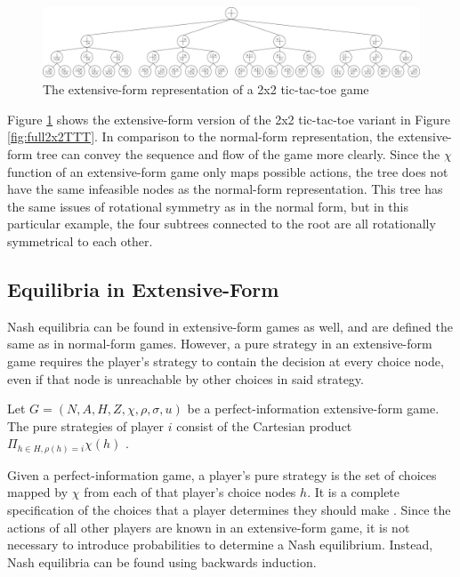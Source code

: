 \begin{figure}[H]
  \centering
  \includegraphics[width=16cm]{figures/TTTExtTree.png}
  \caption{The extensive-form representation of a 2x2 tic-tac-toe game}
  \label{fig:2x2TTTExtForm}
\end{figure}

Figure \ref{fig:2x2TTTExtForm} shows the extensive-form version of the 2x2 tic-tac-toe variant in Figure \ref{fig:full2x2TTT}. In comparison to the normal-form representation, the extensive-form tree can convey the sequence and flow of the game more clearly. Since the $\chi$ function of an extensive-form game only maps possible actions, the tree does not have the same infeasible nodes as the normal-form representation. This tree has the same issues of rotational symmetry as in the normal form, but in this particular example, the four subtrees connected to the root are all rotationally symmetrical to each other.
\newpage
\subsection{Equilibria in Extensive-Form}
Nash equilibria can be found in extensive-form games as well, and are defined the same as in normal-form games. However, a pure strategy in an extensive-form game requires the player's strategy to contain the decision at every choice node, even if that node is unreachable by other choices in said strategy.\\
\begin{define}
  Let $G = (N, A, H, Z, \chi, \rho, \sigma, u)$ be a perfect-information extensive-form game. The pure strategies of player $i$ consist of the Cartesian product $\Pi_{h\in H, \rho(h)=i}\chi(h)$ \cite{shoh09}.
\end{define}
Given a perfect-information game, a player's pure strategy is the set of choices mapped by $\chi$ from each of that player's choice nodes $h$. It is a complete specification of the choices that a player determines they should make \cite{shoh09}. Since the actions of all other players are known in an extensive-form game, it is not necessary to introduce probabilities to determine a Nash equilibrium. Instead, Nash equilibria can be found using backwards induction.

